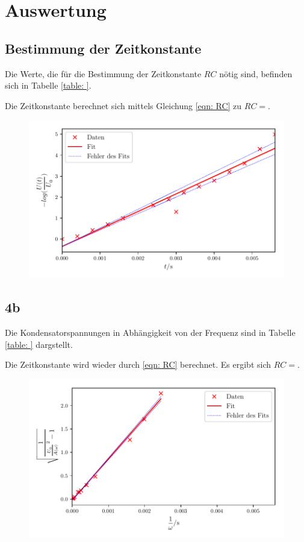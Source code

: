 \section{Auswertung}
\label{sec:Auswertung}


\subsection{Bestimmung der Zeitkonstante}
Die Werte, die für die Bestimmung der Zeitkonstante $RC$ nötig sind, befinden sich in Tabelle \ref{table: }. %


Die Zeitkonstante berechnet sich mittels Gleichung \eqref{eqn: RC} zu $RC = $. %

\begin{figure}
  \centering
  \includegraphics{build/plota.pdf}
  \caption{}
  \label{fig:plota}
\end{figure}

\subsection{4b}
Die Kondensatorspannungen in Abhängigkeit von der Frequenz sind in Tabelle \ref{table: } dargstellt. %



Die Zeitkonstante wird wieder durch \eqref{eqn: RC} berechnet. Es ergibt sich $RC = $. %

\begin{figure}
  \centering
  \includegraphics{build/plotb.pdf}
  \caption{}
  \label{fig:plotb}
\end{figure}

